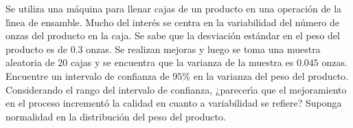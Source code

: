 \begin{enunciado}
 Se utiliza una m\'aquina para llenar cajas de un producto en una operaci\'on de la l\'{\i}nea de ensamble. Mucho del inter\'es se centra en la variabilidad del n\'umero de onzas del producto en la caja. Se sabe que la desviaci\'on est\'andar en el peso del producto es de $0.3$ onzas. Se realizan mejoras y luego se toma una muestra aleatoria de $20$ cajas y se encuentra que la varianza de la muestra es $0.045$ onzas. Encuentre un intervalo de confianza de $95\%$ en la varianza del peso del producto. Considerando el rango del intervalo de confianza, ¿parecer\'{\i}a que el mejoramiento en el proceso increment\'o la calidad en cuanto a variabilidad se refiere? Suponga normalidad en la distribuci\'on del peso del producto.
\end{enunciado}

